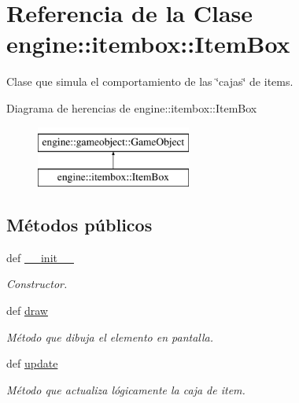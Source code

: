 \hypertarget{classengine_1_1itembox_1_1ItemBox}{
\section{\-Referencia de la \-Clase engine\-:\-:itembox\-:\-:\-Item\-Box}
\label{classengine_1_1itembox_1_1ItemBox}
}


\-Clase que simula el comportamiento de las \char`\"{}cajas\char`\"{} de items.  


\-Diagrama de herencias de engine\-:\-:itembox\-:\-:\-Item\-Box\begin{figure}[H]
\begin{center}
\leavevmode
\includegraphics[height=2.000000cm]{classengine_1_1itembox_1_1ItemBox}
\end{center}
\end{figure}
\subsection*{\-Métodos públicos}
\begin{DoxyCompactItemize}
\item 
def \hyperlink{classengine_1_1itembox_1_1ItemBox_ae68dcd6353ed577412bd895f50f77de8}{\-\_\-\-\_\-init\-\_\-\-\_\-}
\begin{DoxyCompactList}\small\item\em \-Constructor. \end{DoxyCompactList}\item 
def \hyperlink{classengine_1_1itembox_1_1ItemBox_a77c9daa991bc91466455ce3d3caf0b4f}{draw}
\begin{DoxyCompactList}\small\item\em \-Método que dibuja el elemento en pantalla. \end{DoxyCompactList}\item 
\hypertarget{classengine_1_1itembox_1_1ItemBox_acb2d19ac78fc238399033fb826343967}{
def \hyperlink{classengine_1_1itembox_1_1ItemBox_acb2d19ac78fc238399033fb826343967}{update}}
\label{classengine_1_1itembox_1_1ItemBox_acb2d19ac78fc238399033fb826343967}

\begin{DoxyCompactList}\small\item\em \-Método que actualiza lógicamente la caja de item. \end{DoxyCompactList}\end{DoxyCompactItemize}
